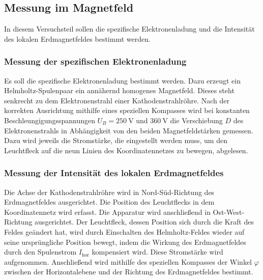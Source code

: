 \subsection{Messung im Magnetfeld}
In diesem Versuchsteil sollen die spezifische Elektronenladung
und die Intensität des lokalen Erdmagnetfeldes bestimmt werden.

\subsubsection{Messung der spezifischen Elektronenladung}
Es soll die spezifische Elektronenladung bestimmt werden.
Dazu erzeugt ein Helmholtz-Spulenpaar ein annähernd homogenes
Magnetfeld. Dieses steht senkrecht zu dem Elektronenstrahl
einer Kathodenstrahlröhre.
Nach der korrekten Ausrichtung mithilfe eines speziellen
Kompasses wird bei konstanten
Beschleungigungsspannungen $U_B = \SI{250}{\volt}$ und 
$\SI{360}{\volt}$ die Verschiebung $D$ des Elektronenstrahls
in Abhängigkeit von den beiden Magnetfeldstärken gemessen. 
Dazu wird jeweils die
Stromstärke, die eingestellt werden muss, um den Leuchtfleck
auf die neun Linien des Koordinatennetzes zu bewegen,
abgelesen.

\subsubsection{Messung der Intensität des lokalen Erdmagnetfeldes}
Die Achse der Kathodenstrahlröhre wird in Nord-Süd-Richtung
des Erdmagnetfeldes ausgerichtet. Die Position des Leuchtflecks 
in dem Koordinatennetz wird erfasst.
Die Apparatur wird anschließend in Ost-West-Richtung ausgerichtet.
Der Leuchtfleck, dessen Position sich durch die Kraft des
Feldes geändert hat, wird durch Einschalten des Helmholtz-Feldes
wieder auf seine ursprüngliche Position bewegt, indem die Wirkung
des Erdmagnetfeldes durch den Spulenstrom $I_\text{hor}$ kompensiert
wird. Diese Stromstärke wird aufgenommen.
Anschließend wird mithilfe des speziellen Kompasses der Winkel
$\varphi$ zwischen der Horizontalebene und der Richtung des
Erdmagnetfeldes bestimmt.